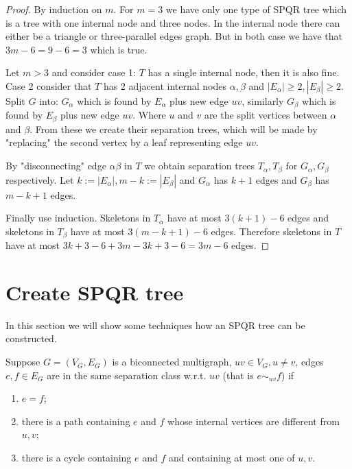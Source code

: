 \begin{proof}
	By induction on $m$. For $m = 3$ we have only one type of SPQR tree which is a tree with one internal node and three nodes. In the internal node there can either be a triangle or three-parallel edges graph. But in both case we have that $3m - 6 = 9 - 6 = 3$ which is true.
	
	Let $m > 3$ and consider case 1: $T$ has a single internal node, then it is also fine. Case 2 consider that $T$ has 2 adjacent internal nodes $\alpha, \beta$ and $|E_\alpha| \geq 2, |E_\beta| \geq 2$. Split $G$ into: $G_\alpha$ which is found by $E_\alpha$ plus new edge $uv$, similarly $G_\beta$ which is found by $E_\beta$ plus new edge $uv$. Where $u$ and $v$ are the split vertices between $\alpha$ and $\beta$. From these we create their separation trees, which will be made by "replacing" the second vertex by a leaf representing edge $uv$.
	
	By "disconnecting" edge $\alpha\beta$ in $T$ we obtain separation trees $T_\alpha, T_\beta$ for $G_\alpha, G_\beta$ respectively. Let $k := |E_\alpha|, m -k := |E_\beta|$ and $G_\alpha$ has $k+1$ edges and $G_\beta$ has $m-k+1$ edges.
	
	Finally use induction. Skeletons in $T_\alpha$ have at most $3(k+1)-6$ edges and skeletons in $T_\beta$ have at most $3(m-k+1)-6$ edges. Therefore skeletons in $T$ have at most $3k + 3 - 6 + 3m - 3k + 3 - 6 = 3m -6$ edges.
\end{proof}

\section{Create SPQR tree}

In this section we will show some techniques how an SPQR tree can be constructed.

\begin{defn}
	Suppose $G = (V_G, E_G)$ is a biconnected multigraph, $uv \in V_G, u \neq v$, edges $e,f \in E_G$ are in the same separation class w.r.t. $uv$ (that is $e \sim_{uv} f$) if
	
	\begin{enumerate}
		\item $e = f$;
		\item there is a path containing $e$ and $f$ whose internal vertices are different from $u,v$;
		\item there is a cycle containing $e$ and $f$ and containing at most one of $u,v$.
	\end{enumerate}
\end{defn}

